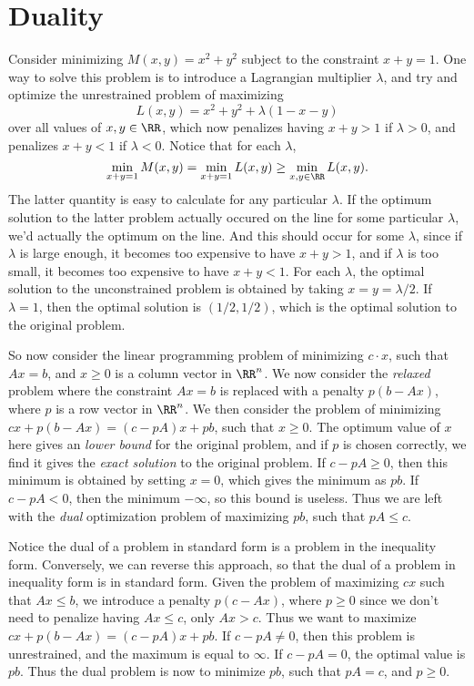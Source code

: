 \chapter{Duality}

Consider minimizing $M(x,y) = x^2 + y^2$ subject to the constraint $x + y = 1$. One way to solve this problem is to introduce a Lagrangian multiplier $\lambda$, and try and optimize the unrestrained problem of maximizing
%
\[ L(x,y) = x^2 + y^2 + \lambda (1 - x - y) \]
%
over all values of $x, y \in \RR$, which now penalizes having $x + y > 1$ if $\lambda > 0$, and penalizes $x + y < 1$ if $\lambda < 0$. Notice that for each $\lambda$,
%
\[ \min_{x + y = 1} M(x,y) = \min_{x + y = 1} L(x,y) \geq \min_{x,y \in \RR} L(x,y). \]
%
The latter quantity is easy to calculate for any particular $\lambda$. If the optimum solution to the latter problem actually occured on the line for some particular $\lambda$, we'd actually the optimum on the line. And this should occur for some $\lambda$, since if $\lambda$ is large enough, it becomes too expensive to have $x + y > 1$, and if $\lambda$ is too small, it becomes too expensive to have $x + y < 1$. For each $\lambda$, the optimal solution to the unconstrained problem is obtained by taking $x = y = \lambda/2$. If $\lambda = 1$, then the optimal solution is $(1/2,1/2)$, which is the optimal solution to the original problem.

So now consider the linear programming problem of minimizing $c \cdot x$, such that $Ax = b$, and $x \geq 0$ is a column vector in $\RR^n$. We now consider the \emph{relaxed} problem where the constraint $Ax = b$ is replaced with a penalty $p(b - Ax)$, where $p$ is a row vector in $\RR^n$. We then consider the problem of minimizing $cx + p(b - Ax) = (c - pA)x + pb$, such that $x \geq 0$. The optimum value of $x$ here gives an \emph{lower bound} for the original problem, and if $p$ is chosen correctly, we find it gives the \emph{exact solution} to the original problem. If $c - pA \geq 0$, then this minimum is obtained by setting $x = 0$, which gives the minimum as $pb$. If $c - pA < 0$, then the minimum $-\infty$, so this bound is useless. Thus we are left with the \emph{dual} optimization problem of maximizing $pb$, such that $pA \leq c$.

Notice the dual of a problem in standard form is a problem in the inequality form. Conversely, we can reverse this approach, so that the dual of a problem in inequality form is in standard form. Given the problem of maximizing $cx$ such that $Ax \leq b$, we introduce a penalty $p(c - Ax)$, where $p \geq 0$ since we don't need to penalize having $Ax \leq c$, only $Ax > c$. Thus we want to maximize $cx + p(b - Ax) = (c - pA)x + pb$. If $c - pA \neq 0$, then this problem is unrestrained, and the maximum is equal to $\infty$. If $c - pA = 0$, the optimal value is $pb$. Thus the dual problem is now to minimize $pb$, such that $pA = c$, and $p \geq 0$.

